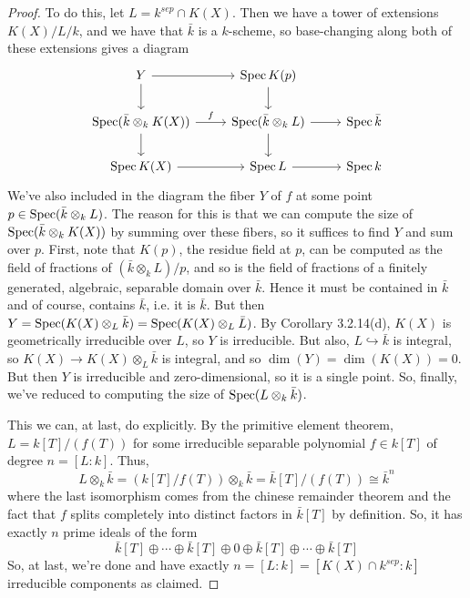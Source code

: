 \begin{proof}
	To do this, let $L = k^{sep} \cap K(X)$. Then we have a tower of extensions $K(X)/L/k$, and we have that $\bar{k}$ is a $k$-scheme, so base-changing along both of these extensions gives a diagram
	\[ \begin{tikzcd} Y \arrow[r] \arrow[d] & \Spec K(p) \arrow[d] \\ \Spec(\bar{k} \otimes_k K(X)) \arrow[r,"f"] \arrow[d] & \Spec(\bar{k} \otimes_k L) \arrow[r] \arrow[d] & \Spec \bar{k} \\ \Spec K(X) \arrow[r] & \Spec L \arrow[r] & \Spec k \end{tikzcd} \]
	We've also included in the diagram the fiber $Y$ of $f$ at some point $p \in \operatorname{Spec}(\bar{k} \otimes_k L)$. The reason for this is that we can compute the size of $\operatorname{Spec}(\bar{k} \otimes_k K(X))$ by summing over these fibers, so it suffices to find $Y$ and sum over $p$. First, note that $K(p)$, the residue field at $p$, can be computed as the field of fractions of $(\bar{k} \otimes_k L)/p$, and so is the field of fractions of a finitely generated, algebraic, separable domain over $\bar{k}$. Hence it must be contained in $\bar{k}$ and of course, contains $\bar{k}$, i.e. it is $\bar{k}$. But then $Y = \operatorname{Spec}(K(X) \otimes_L \bar{k}) = \operatorname{Spec}(K(X) \otimes_L \bar{L})$. By Corollary 3.2.14(d), $K(X)$ is geometrically irreducible over $L$, so $Y$ is irreducible. But also, $L \hookrightarrow \bar{k}$ is integral, so $K(X) \to K(X) \otimes_L \bar{k}$ is integral, and so $\dim(Y) = \dim(K(X)) = 0$. But then $Y$ is irreducible and zero-dimensional, so it is a single point. So, finally, we've reduced to computing the size of $\operatorname{Spec}(L \otimes_k \bar{k})$.
	
	This we can, at last, do explicitly. By the primitive element theorem, $L = k[T]/(f(T))$ for some irreducible separable polynomial $f \in k[T]$ of degree $n = [L:k]$. Thus,
	\[ L \otimes_k \bar{k} = (k[T]/f(T)) \otimes_k \bar{k} = \bar{k}[T]/(f(T)) \cong \bar{k}^n \]
	where the last isomorphism comes from the chinese remainder theorem and the fact that $f$ splits completely into distinct factors in $\bar{k}[T]$ by definition. So, it has exactly $n$ prime ideals of the form
	\[ \bar{k}[T] \oplus \cdots \oplus \bar{k}[T] \oplus 0 \oplus \bar{k}[T] \oplus \cdots \oplus \bar{k}[T] \]
	So, at last, we're done and have exactly $n = [L:k] = [K(X) \cap k^{sep} : k]$ irreducible components as claimed.
\end{proof}
